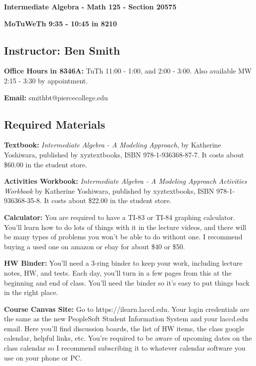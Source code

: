 \documentclass[12pt, twoside]{article}
\begin{document}
\begin{center}
	\large{\textbf{Intermediate Algebra - Math 125 - Section 20575}}
			
	\large{\textbf{MoTuWeTh 9:35 - 10:45 in 8210}}
\end{center}

\subsection*{Instructor: Ben Smith}
	
   \noindent \textbf{Office Hours in 8346A:} TuTh 11:00 - 1:00, and 2:00 - 3:00. Also available MW 2:15 - 3:30 by appointment.
		
	\noindent \textbf{Email:} smithbt@piercecollege.edu

\subsection*{Required Materials}
      \textbf{Textbook:}  \emph{Intermediate Algebra - A Modeling Approach}, by Katherine Yoshiwara, published by xyztextbooks, ISBN 978-1-936368-87-7. It costs about \$60.00 in the student store.
      
      \noindent\textbf{Activities Workbook:} \emph{Intermediate Algebra - A Modeling Approach Activities Workbook} by Katherine Yoshiwara, published by xyztextbooks, ISBN 978-1-936368-35-8. It costs about \$22.00 in the student store.
      
      \noindent\textbf{Calculator:} You are required to have a TI-83 or TI-84 graphing calculator. You'll learn how to do lots of things with it in the lecture videos, and there will be many types of problems you won't be able to do without one. I recommend buying a used one on amazon or ebay for about \$40 or \$50.
   
      \noindent\textbf{HW Binder:} You'll need a 3-ring binder to keep your work, including lecture notes, HW, and tests.  Each day, you'll turn in a few pages from this at the beginning and end of class. You'll need the binder so it's easy to put things back in the right place.
   
      \noindent\textbf{Course Canvas Site:} Go to https://ilearn.laccd.edu. Your login credentials are the same as the new PeopleSoft Student Information System and your laccd.edu email. Here you'll find discussion boards, the list of HW items, the class google calendar, helpful links, etc. You're required to be aware of upcoming dates on the class calendar so I recommend subscribing it to whatever calendar software you use on your phone or PC.  
\end{document}
